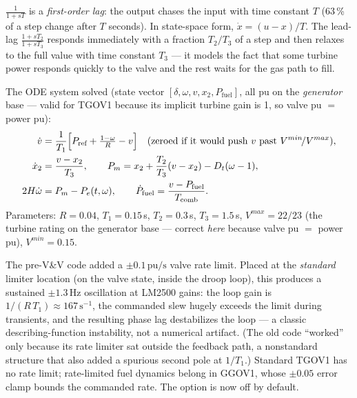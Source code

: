 \documentclass[11pt]{article}
\newcommand{\pu}{\,\text{pu}}
\begin{document}
\begin{novicebox}
$\frac{1}{1+sT}$ is a \emph{first-order lag}: the output chases the input
with time constant $T$ (63\,\% of a step change after $T$ seconds). In
state-space form, $\dot{x} = (u - x)/T$. The lead-lag
$\frac{1+sT_2}{1+sT_3}$ responds immediately with a fraction $T_2/T_3$ of
a step and then relaxes to the full value with time constant $T_3$ --- it
models the fact that some turbine power responds quickly to the valve and
the rest waits for the gas path to fill.
\end{novicebox}

The ODE system solved (state vector $[\delta, \omega, v, x_2,
P_\text{fuel}]$, all pu on the \emph{generator} base --- valid for TGOV1
because its implicit turbine gain is 1, so valve pu $=$ power pu):
\begin{align}
  \dot v &= \frac{1}{T_1}\Bigl[P_\text{ref} + \tfrac{1-\omega}{R} - v\Bigr]
     \quad\text{(zeroed if it would push $v$ past } V^{min}\!/V^{max}\text{)},\\
  \dot x_2 &= \frac{v - x_2}{T_3}, \qquad
  P_m = x_2 + \frac{T_2}{T_3}(v - x_2) - D_t(\omega - 1), \\
  2H\dot\omega &= P_m - P_e(t,\omega), \qquad
  \dot P_\text{fuel} = \frac{v - P_\text{fuel}}{T_\text{comb}} .
\end{align}
Parameters: $R=0.04$, $T_1 = 0.15$\,s, $T_2 = 0.3$\,s, $T_3 = 1.5$\,s,
$V^{max} = 22/23$ (the turbine rating on the generator base --- correct
\emph{here} because valve pu $=$ power pu), $V^{min} = 0.15$.

\begin{findingbox}
The pre-V\&V code added a $\pm0.1\pu/\text{s}$ valve rate limit. Placed at
the \emph{standard} limiter location (on the valve state, inside the droop
loop), this produces a sustained $\pm1.3$\,Hz oscillation at LM2500 gains:
the loop gain is $1/(R\,T_1) \approx 167\,\text{s}^{-1}$, the commanded
slew hugely exceeds the limit during transients, and the resulting phase
lag destabilizes the loop --- a classic describing-function instability,
not a numerical artifact. (The old code ``worked'' only because its rate
limiter sat outside the feedback path, a nonstandard structure that also
added a spurious second pole at $1/T_1$.) Standard TGOV1 has no rate
limit; rate-limited fuel dynamics belong in GGOV1, whose $\pm0.05$ error
clamp bounds the commanded rate. The option is now off by default.
\end{findingbox}
\end{document}
